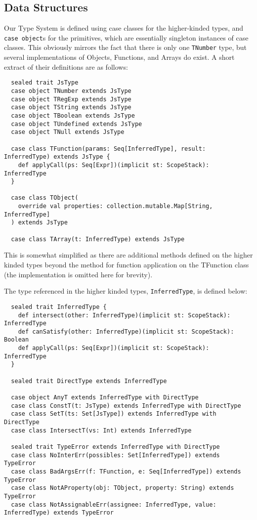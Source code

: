 \documentclass[british, twoside]{bhamthesis}
\theoremstyle{definition}
\begin{document}
    \subsection{Data Structures}
      Our Type System is defined using case classes for the higher-kinded types, and \texttt{case object}s for the primitives, which are essentially singleton instances of case classes. This obviously mirrors the fact that there is only one \texttt{TNumber} type, but several implementations of Objects, Functions, and Arrays do exist. A short extract of their definitions are as follows:
      \begin{lstlisting}
  sealed trait JsType
  case object TNumber extends JsType
  case object TRegExp extends JsType
  case object TString extends JsType
  case object TBoolean extends JsType
  case object TUndefined extends JsType
  case object TNull extends JsType

  case class TFunction(params: Seq[InferredType], result: InferredType) extends JsType {
    def applyCall(ps: Seq[Expr])(implicit st: ScopeStack): InferredType
  }

  case class TObject(
    override val properties: collection.mutable.Map[String, InferredType]
  ) extends JsType

  case class TArray(t: InferredType) extends JsType
      \end{lstlisting}

      This is somewhat simplified as there are additional methods defined on the higher kinded types beyond the method for function application on the TFunction class (the implementation is omitted here for brevity).

      The type referenced in the higher kinded types, \texttt{InferredType}, is defined below:

      \begin{lstlisting}
  sealed trait InferredType {
    def intersect(other: InferredType)(implicit st: ScopeStack): InferredType
    def canSatisfy(other: InferredType)(implicit st: ScopeStack): Boolean
    def applyCall(ps: Seq[Expr])(implicit st: ScopeStack): InferredType
  }

  sealed trait DirectType extends InferredType

  case object AnyT extends InferredType with DirectType
  case class ConstT(t: JsType) extends InferredType with DirectType
  case class SetT(ts: Set[JsType]) extends InferredType with DirectType
  case class IntersectT(vs: Int) extends InferredType

  sealed trait TypeError extends InferredType with DirectType
  case class NoInterErr(possibles: Set[InferredType]) extends TypeError
  case class BadArgsErr(f: TFunction, e: Seq[InferredType]) extends TypeError
  case class NotAProperty(obj: TObject, property: String) extends TypeError
  case class NotAssignableErr(assignee: InferredType, value: InferredType) extends TypeError
      \end{lstlisting}
\end{document}
